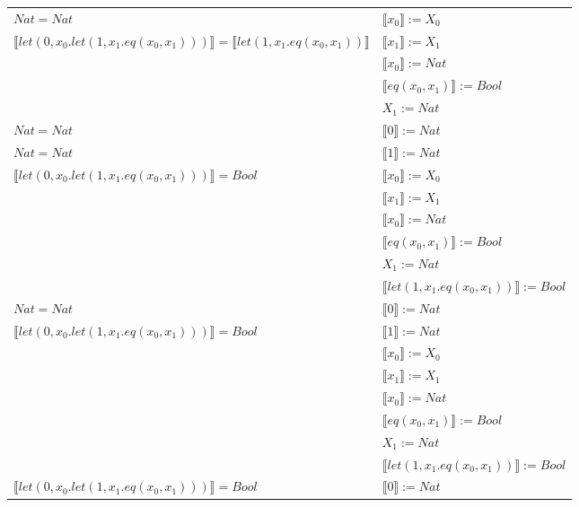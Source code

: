 \begin{exercise}
\begin{description}
\begin{center}
\begin{longtable}{ | l | l | }
                        $Nat = Nat$ &  $ \llbracket x_0 \rrbracket := X_0$  \\
                        $ \llbracket let(0,x_0.let(1,x_1.eq(x_0,x_1))) \rrbracket =  \llbracket let(1,x_1.eq(x_0,x_1)) \rrbracket$ & $ \llbracket x_1 \rrbracket := X_1$ \\
                        &  $ \llbracket x_0 \rrbracket := Nat$ \\
                        &  $ \llbracket eq(x_0,x_1) \rrbracket := Bool$ \\
                        &  $X_1 := Nat$ \\
                      \hline
                        $Nat = Nat$  &   $ \llbracket 0 \rrbracket := Nat$ \\
                        $Nat = Nat$ & $ \llbracket 1 \rrbracket := Nat$ \\
                        $ \llbracket let(0,x_0.let(1,x_1.eq(x_0,x_1))) \rrbracket = Bool$ &  $ \llbracket x_0 \rrbracket := X_0$   \\
                        & $ \llbracket x_1 \rrbracket := X_1$  \\
                        & $ \llbracket x_0 \rrbracket := Nat$  \\
                        & $ \llbracket eq(x_0,x_1) \rrbracket := Bool$  \\
                        & $X_1 := Nat$\\
                        & $ \llbracket let(1,x_1.eq(x_0,x_1)) \rrbracket := Bool$ \\
                      \hline
                        $Nat = Nat$  &   $ \llbracket 0 \rrbracket := Nat$ \\
                        $ \llbracket let(0,x_0.let(1,x_1.eq(x_0,x_1))) \rrbracket = Bool$ & $ \llbracket 1 \rrbracket := Nat$ \\
                        &  $ \llbracket x_0 \rrbracket := X_0$   \\
                        & $ \llbracket x_1 \rrbracket := X_1$  \\
                        & $ \llbracket x_0 \rrbracket := Nat$  \\
                        & $ \llbracket eq(x_0,x_1) \rrbracket := Bool$  \\
                        & $X_1 := Nat$\\
                        & $ \llbracket let(1,x_1.eq(x_0,x_1)) \rrbracket := Bool$ \\
                      \hline
                        $ \llbracket let(0,x_0.let(1,x_1.eq(x_0,x_1))) \rrbracket = Bool$ & $ \llbracket 0 \rrbracket := Nat$ \\

\end{longtable}
\end{center}
\end{description}
\end{exercise}
